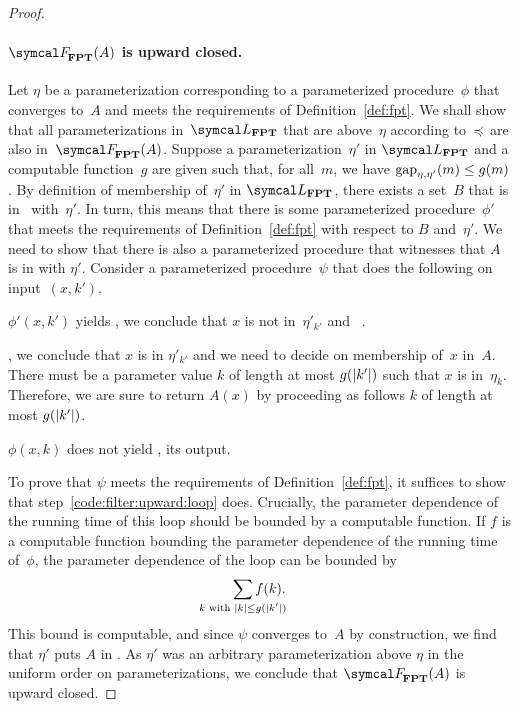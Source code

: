 \begin{proof}
  \paragraph{$\calF_\cl{FPT}(A)$ is upward closed.}
  Let $\eta$ be a parameterization corresponding to a parameterized procedure~$\phi$ that converges to~$A$ and meets the requirements of Definition~\ref{def:fpt}.
  We shall show that all parameterizations in~$\calL_\cl{FPT}$ that are above~$\eta$ according to~$\preccurlyeq$ are also in~$\calF_\cl{FPT}(A)$.
  Suppose a parameterization~$\eta'$ in $\calL_\cl{FPT}$ and a computable function~$g$ are given such that, for all~$m$, we have $\operatorname{gap}_{\eta, \eta'}(m) \le g(m)$.
  By definition of membership of~$\eta'$ in $\calL_\cl{FPT}$, there exists a set~$B$ that is in~ with~$\eta'$.
  In turn, this means that there is some parameterized procedure~$\phi'$ that meets the requirements of Definition~\ref{def:fpt} with respect to $B$ and~$\eta'$.
  We need to show that there is also a parameterized procedure that witnesses that $A$ is in  with $\eta'$.
  Consider a parameterized procedure~$\psi$ that does the following on input~$(x, k')$.
  \begin{codelisting}
  \item
     $\phi'(x, k')$ yields , we conclude that $x$ is not in~$\eta'_{k'}$ and ~.
  \item\label{code:filter:upward:loop}%
    , we conclude that $x$ is in $\eta'_{k'}$ and we need to decide on membership of~$x$ in~$A$.
    There must be a parameter value $k$ of length at most $g(\length{k'})$ such that $x$ is in~$\eta_k$.
    Therefore, we are sure to return $A(x)$ by proceeding as follows  $k$ of length at most $g(\length{k'})$.
    \begin{codelisting}
    \item {} $\phi(x, k)$ does not yield ,  its output.
    \end{codelisting}
  \end{codelisting}

  To prove that $\psi$ meets the requirements of Definition~\ref{def:fpt}, it suffices to show that step~\ref{code:filter:upward:loop} does.
  Crucially, the parameter dependence of the running time of this loop should be bounded by a computable function.
  If $f$ is a computable function bounding the parameter dependence of the running time of~$\phi$, the parameter dependence of the loop can be bounded by
  \begin{equation*}
    \sum_{\mathclap{k\text{ with }\length{k} \le g(\length{k'})}} f(k).
  \end{equation*}
  This bound is computable, and since $\psi$ converges to~$A$ by construction, we find that $\eta'$ puts $A$ in .
  As $\eta'$ was an arbitrary parameterization above $\eta$ in the uniform order on parameterizations, we conclude that $\calF_\cl{FPT}(A)$ is upward closed.


\end{proof}
